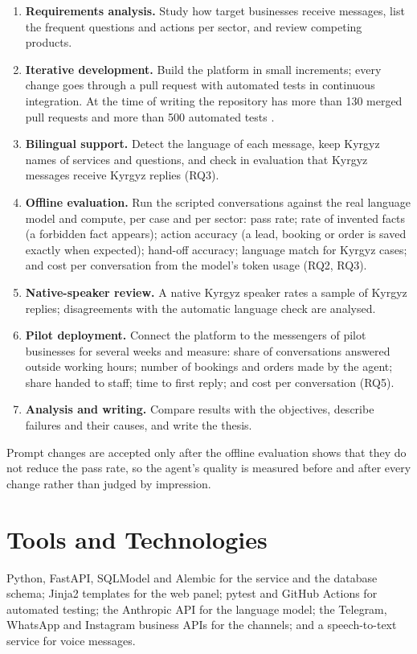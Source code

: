 \begin{enumerate}
	\item \textbf{Requirements analysis.} Study how target businesses receive messages, list the frequent questions and
	actions per sector, and review competing products.
	\item \textbf{Iterative development.} Build the platform in small increments; every change goes through a pull
	request with automated tests in continuous integration. At the time of writing the repository has more than 130
	merged pull requests and more than 500 automated tests \parencite{asilov2026joop}.
	\item \textbf{Bilingual support.} Detect the language of each message, keep Kyrgyz names of services and questions,
	and check in evaluation that Kyrgyz messages receive Kyrgyz replies (RQ3).
	\item \textbf{Offline evaluation.} Run the scripted conversations against the real language model and compute, per
	case and per sector: pass rate; rate of invented facts (a forbidden fact appears); action accuracy (a lead, booking or
	order is saved exactly when expected); hand-off accuracy; language match for Kyrgyz cases; and cost per conversation
	from the model's token usage (RQ2, RQ3).
	\item \textbf{Native-speaker review.} A native Kyrgyz speaker rates a sample of Kyrgyz replies; disagreements with the
	automatic language check are analysed.
	\item \textbf{Pilot deployment.} Connect the platform to the messengers of pilot businesses for several weeks and
	measure: share of conversations answered outside working hours; number of bookings and orders made by the agent;
	share handed to staff; time to first reply; and cost per conversation (RQ5).
	\item \textbf{Analysis and writing.} Compare results with the objectives, describe failures and their causes, and
	write the thesis.
\end{enumerate}

Prompt changes are accepted only after the offline evaluation shows that they do not reduce the pass rate, so the agent's
quality is measured before and after every change rather than judged by impression.

\section{Tools and Technologies}

Python, FastAPI, SQLModel and Alembic for the service and the database schema; Jinja2 templates for the web panel;
pytest and GitHub Actions for automated testing; the Anthropic API for the language model; the Telegram, WhatsApp and
Instagram business APIs for the channels; and a speech-to-text service for voice messages.


